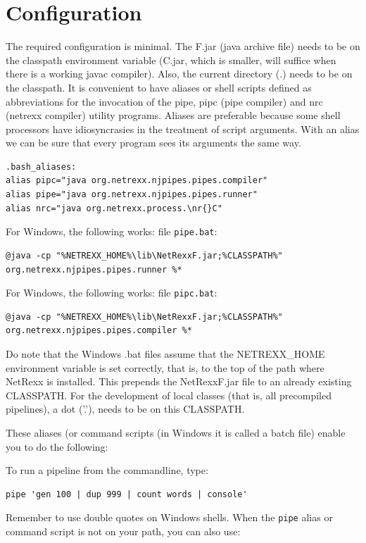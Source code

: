 \section{Configuration}
The required configuration is minimal. The \nr{}F.jar (java archive
file) needs to be on the classpath environment variable (\nr{}C.jar, which is smaller, will suffice when there is a working javac compiler). Also, the current directory (.) needs to be on the classpath.
It is convenient to have aliases or shell scripts defined as abbreviations for the invocation of the pipe, pipc (pipe compiler) and nrc (netrexx compiler) utility programs. 
Aliases are preferable because some shell processors have
idiosyncrasies in the treatment of script arguments. With an alias we
can be sure that every \nr{} program sees its arguments the same
way.
\begin{verbatim}
.bash_aliases:
alias pipc="java org.netrexx.njpipes.pipes.compiler"
alias pipe="java org.netrexx.njpipes.pipes.runner"
alias nrc="java org.netrexx.process.\nr{}C"
\end{verbatim}
For Windows, the following works: file \texttt{pipe.bat}:
\begin{verbatim}
@java -cp "%NETREXX_HOME%\lib\NetRexxF.jar;%CLASSPATH%" org.netrexx.njpipes.pipes.runner %*
\end{verbatim}
For Windows, the following works: file \texttt{pipc.bat}:
\begin{verbatim}
@java -cp "%NETREXX_HOME%\lib\NetRexxF.jar;%CLASSPATH%" org.netrexx.njpipes.pipes.compiler %*
\end{verbatim}

\begin{shaded}
Do note that the Windows .bat files assume that the NETREXX\_HOME
environment variable is set correctly, that is, to the top of the path
where NetRexx is installed. This prepends the NetRexxF.jar file to an
already existing CLASSPATH. For the development of local classes (that is, all precompiled pipelines), a
dot ('.'), needs to be on this CLASSPATH.
\end{shaded}
These aliases (or command scripts (in Windows it is called a batch
file) enable you to do the following:

To run a pipeline from the commandline, type:
\begin{lstlisting}
pipe 'gen 100 | dup 999 | count words | console'
\end{lstlisting}

Remember to use double quotes on Windows shells. When the \texttt{pipe}
alias or command script is not on your path, you can also use:

